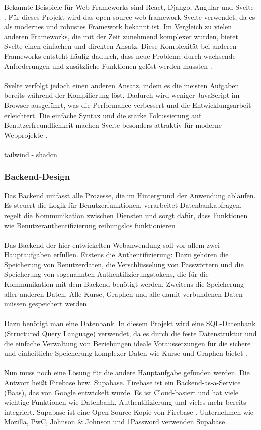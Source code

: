 Bekannte Beispiele für Web-Frameworks sind React, Django, Angular und Svelte \parencite{mdn-intro-to-cs-frameworks}. Für dieses Projekt wird das open-source-web-framework Svelte verwendet, da es als modernes und robustes Framework bekannt ist. Im Vergleich zu vielen anderen Frameworks, die mit der Zeit zunehmend komplexer wurden, bietet Svelte einen einfachen und direkten Ansatz. Diese Komplexität bei anderen Frameworks entsteht häufig dadurch, dass neue Probleme durch wachsende Anforderungen und zusätzliche Funktionen gelöst werden mussten \parencite{svelte-rethinking}.\\\\
Svelte verfolgt jedoch einen anderen Ansatz, indem es die meisten Aufgaben bereits während der Kompilierung löst. Dadurch wird weniger JavaScript im Browser ausgeführt, was die Performance verbessert und die Entwicklungsarbeit erleichtert. Die einfache Syntax und die starke Fokussierung auf Benutzerfreundlichkeit machen Svelte besonders attraktiv für moderne Webprojekte \parencite{svelte-rethinking}.\\\\
tailwind - shadcn
\newpage
\subsubsection{Backend-Design}
Das Backend umfasst alle Prozesse, die im Hintergrund der Anwendung ablaufen. Es steuert die Logik für Benutzerfunktionen, verarbeitet Datenbankabfragen, regelt die Kommunikation zwischen Diensten und sorgt dafür, dass Funktionen wie Benutzerauthentifizierung reibungslos funktionieren \parencite{nam-le-thanh-web-designer-2023}.\\\\
Das Backend der hier entwickelten Webanwendung soll vor allem zwei Hauptaufgaben erfüllen. Erstens die Authentifizierung: Dazu gehören die Speicherung von Benutzerdaten, die Verschlüsselung von Passwörtern und die Speicherung von sogenannten Authentifizierungstokens, die für die Kommunikation mit dem Backend benötigt werden. Zweitens die Speicherung aller anderen Daten. Alle Kurse, Graphen und alle damit verbundenen Daten müssen gespeichert werden.\\\\
Dazu benötigt man eine Datenbank. In diesem Projekt wird eine SQL-Datenbank (Structured Query Language) verwendet, da es durch die feste Datenstruktur und die einfache Verwaltung von Beziehungen ideale Voraussetzungen für die sichere und einheitliche Speicherung komplexer Daten wie Kurse und Graphen bietet \parencite{aws-sql}.\\\\
Nun muss noch eine Lösung für die andere Hauptaufgabe gefunden werden. Die Antwort heißt Firebase bzw. Supabase. Firebase ist ein Backend-as-a-Service (Baas), das von Google entwickelt wurde. Es ist Cloud-basiert und hat viele wichtige Funktionen wie Datenbank, Authentifizierung und vieles mehr bereits integriert. Supabase ist eine Open-Source-Kopie von Firebase \parencite{wilson-2022}. Unternehmen wie Mozilla, PwC, Johnson \& Johnson und 1Password verwenden Supabase \parencite{sb-companies}.\\\\

